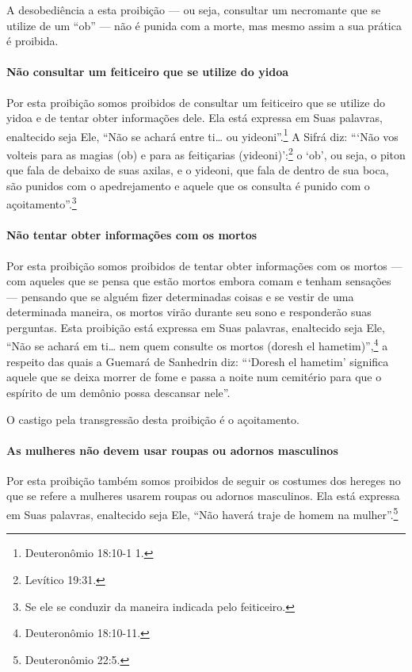 A desobediência a esta proibição --- ou seja, consultar um necromante
que se utilize de um ``ob'' --- não é punida com a morte, mas mesmo
assim a sua prática é proibida.

\paragraph{Não consultar um feiticeiro que se utilize do yidoa}

Por esta proibição somos proibidos de consultar um feiticeiro que se
utilize do yidoa e de tentar obter informações dele. Ela está
expressa em Suas palavras, enaltecido seja Ele, ``Não se achará entre
ti\ldots{} ou yideoni''.\footnote{Deuteronômio 18:10-1 1.} A Sifrá diz: ```Não vos
volteis para as magias (ob) e para as feitiçarias (yideoni)':\footnote{Levítico
19:31.} o `ob', ou seja, o piton que fala de debaixo de suas axilas, e o
yideoni, que fala de dentro de sua boca, são punidos com o
apedrejamento e aquele que os consulta é punido com o
açoitamento''.\footnote{Se ele se conduzir da maneira indicada pelo feiticeiro.}

\paragraph{Não tentar obter informações com os mortos}

Por esta proibição somos proibidos de tentar obter informações com os
mortos --- com aqueles que se pensa que estão mortos embora comam e
tenham sensações --- pensando que se alguém fizer determinadas coisas e
se vestir de uma determinada maneira, os mortos virão durante seu sono e
responderão suas perguntas. Esta proibição está expressa em Suas
palavras, enaltecido seja Ele, ``Não se achará em ti\ldots{} nem quem
consulte os mortos (doresh el hametim)'',\footnote{Deuteronômio 18:10-11.} a
respeito das quais a Guemará de Sanhedrin diz: ```Doresh el hametim'
significa aquele que se deixa morrer de fome e passa a noite num
cemitério para que o espírito de um demônio possa descansar nele''.

O castigo pela transgressão desta proibição é o açoitamento.

\paragraph{As mulheres não devem usar roupas ou adornos masculinos}

Por esta proibição também somos proibidos de seguir os costumes dos
hereges no que se refere a mulheres usarem roupas ou adornos masculinos.
Ela está expressa em Suas palavras, enaltecido seja Ele, ``Não haverá
traje de homem na mulher''.\footnote{Deuteronômio 22:5.}

